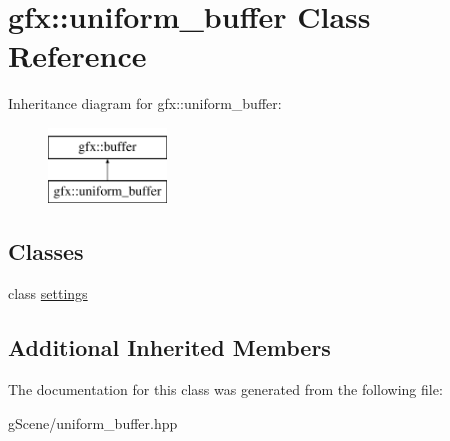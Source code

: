 \hypertarget{classgfx_1_1uniform__buffer}{\section{gfx\-:\-:uniform\-\_\-buffer Class Reference}
\label{classgfx_1_1uniform__buffer}
}
Inheritance diagram for gfx\-:\-:uniform\-\_\-buffer\-:\begin{figure}[H]
\begin{center}
\leavevmode
\includegraphics[height=2.000000cm]{classgfx_1_1uniform__buffer}
\end{center}
\end{figure}
\subsection*{Classes}
\begin{DoxyCompactItemize}
\item 
class \hyperlink{classgfx_1_1uniform__buffer_1_1settings}{settings}
\end{DoxyCompactItemize}
\subsection*{Additional Inherited Members}


The documentation for this class was generated from the following file\-:\begin{DoxyCompactItemize}
\item 
g\-Scene/uniform\-\_\-buffer.\-hpp\end{DoxyCompactItemize}
